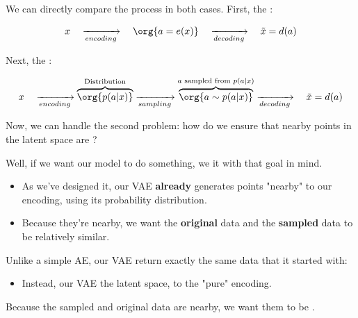             We can directly compare the process in both cases. First, the :

            \begin{equation}
                x  \quad \xrightarrow[encoding]{} \quad
                \org{a=e(x)} \quad \xrightarrow[decoding]{} \quad
                \tilde{x} = d(a)
            \end{equation}

            Next, the :

            \begin{equation*}
                x  \quad \xrightarrow[encoding]{}
                \overbrace{ \org{p(a|x)} }^{\text{Distribution}}
                \xrightarrow[sampling]{}
                \overbrace{ \org{a \sim p(a|x)} }^{\text{$a$ sampled from $p(a|x)$}}
                \xrightarrow[decoding]{} \quad
                \tilde{x} = d(a)
            \end{equation*}

            \subsecdiv

            Now, we can handle the second problem: how do we ensure that nearby points in the latent space are ?

            Well, if we want our model to do something, we  it with that goal in mind.

            \begin{itemize}
                \item As we've designed it, our VAE \textbf{already} generates points "nearby" to our encoding, using its probability distribution.

                \item Because they're nearby, we want the \textbf{original} data and the \textbf{sampled} data to be relatively similar.\\
            \end{itemize}

            \begin{concept}
                Unlike a simple AE, our VAE  return exactly the same data that it started with: 

                \begin{itemize}
                    \item Instead, our VAE  the latent space,  to the "pure" encoding.
                \end{itemize}

                Because the sampled and original data are nearby, we want them to be .
            \end{concept}
            

